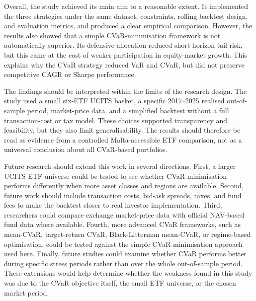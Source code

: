 \par Overall, the study achieved its main aim to a reasonable extent. It implemented the three strategies under the same dataset, constraints, rolling backtest design, and evaluation metrics, and produced a clear empirical comparison. However, the results also showed that a simple CVaR-minimisation framework is not automatically superior. Its defensive allocation reduced short-horizon tail-risk, but this came at the cost of weaker participation in equity-market growth. This explains why the CVaR strategy reduced VaR and CVaR, but did not preserve competitive CAGR or Sharpe performance.

\par The findings should be interpreted within the limits of the research design. The study used a small six-ETF UCITS basket, a specific 2017--2025 realised out-of-sample period, market-price data, and a simplified backtest without a full transaction-cost or tax model. These choices supported transparency and feasibility, but they also limit generalisability. The results should therefore be read as evidence from a controlled Malta-accessible ETF comparison, not as a universal conclusion about all CVaR-based portfolios.

\par Future research should extend this work in several directions. First, a larger UCITS ETF universe could be tested to see whether CVaR-minimisation performs differently when more asset classes and regions are available. Second, future work should include transaction costs, bid-ask spreads, taxes, and fund fees to make the backtest closer to real investor implementation. Third, researchers could compare exchange market-price data with official NAV-based fund data where available. Fourth, more advanced CVaR frameworks, such as mean-CVaR, target-return CVaR, Black-Litterman mean-CVaR, or regime-based optimisation, could be tested against the simple CVaR-minimisation approach used here. Finally, future studies could examine whether CVaR performs better during specific stress periods rather than over the whole out-of-sample period. These extensions would help determine whether the weakness found in this study was due to the CVaR objective itself, the small ETF universe, or the chosen market period.
